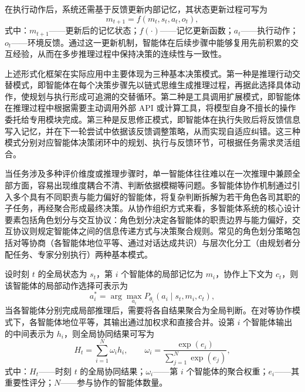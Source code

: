 在执行动作后，系统还需基于反馈更新内部记忆，其状态更新过程可写为
\begin{equation}
m_{t+1}=f(m_t,s_t,a_t,o_t),
\end{equation}
式中：$m_{t+1}$——更新后的记忆状态；$f(\cdot)$——记忆更新函数；$a_t$——执行动作；$o_t$——环境反馈。通过这一更新机制，智能体在后续步骤中能够复用先前积累的交互经验，从而在多步推理过程中保持决策的连续性与一致性。

上述形式化框架在实际应用中主要体现为三种基本决策模式。第一种是推理行动交替模式，即智能体在每个决策步骤先以链式思维生成推理过程，再据此选择具体动作，使规划与执行形成可追溯的交替循环\cite{yao2023react}。第二种是工具调用扩展模式，即智能体在推理过程中根据需要主动调用外部 API 或计算工具，将模型自身不擅长的操作委托给专用模块完成\cite{schick2024toolformer}。第三种是反思修正模式，即智能体在执行失败后将反馈信息写入记忆，并在下一轮尝试中依据该反馈调整策略，从而实现自适应纠错\cite{shinn2024reflexion}。这三种模式分别对应智能体决策闭环中的规划、执行与反馈环节，可根据任务需求灵活组合。

\label{subsec:multi_agent}

当任务涉及多种评价维度或推理步骤时，单一智能体往往难以在一次推理中兼顾全部方面，容易出现维度耦合不清、判断依据模糊等问题。多智能体协作机制通过引入多个具有不同职责与能力偏好的智能体，将复杂判断拆解为若干角色各司其职的子任务，再经聚合形成最终决策\cite{wang2024survey_agent}。从协作组织方式来看，多智能体系统的核心设计要素包括角色划分与交互协议：角色划分决定各智能体的职责边界与能力偏好，交互协议则规定智能体之间的信息传递方式与决策聚合规则。常见的角色划分策略包括对等协商（各智能体地位平等、通过对话达成共识）\cite{li2023camel}与层次化分工（由规划者分配任务、专家分别执行）\cite{hong2024metagpt}两种基本模式。

设时刻 $t$ 的全局状态为 $s_t$，第 $i$ 个智能体的局部记忆为 $m_i$，协作上下文为 $c_t$，则该智能体的局部动作选择可表示为
\begin{equation}
a_i^{*}=\arg\max_{a_i} P_{\theta_i}(a_i\mid s_t,m_i,c_t),
\end{equation}
当各智能体分别完成局部推理后，需要将各自结果聚合为全局判断。在对等协作模式下，各智能体地位平等，其输出通过加权求和直接合并。设第 $i$ 个智能体输出的中间表示为 $h_i$，则全局协同结果可写为
\begin{equation}\label{eq:peer_aggregation}
H_t=\sum_{i=1}^{N}\omega_i h_i, \qquad \omega_i=\frac{\exp(e_i)}{\sum_{j=1}^{N}\exp(e_j)},
\end{equation}
式中：$H_t$——时刻 $t$ 的全局协同结果；$\omega_i$——第 $i$ 个智能体的聚合权重；$e_i$——其重要性评分；$N$——参与协作的智能体数量。

